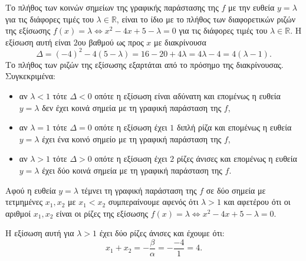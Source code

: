 \begin{alist}
\begin{rlist}
\item Το πλήθος των κοινών σημείων της γραφικής παράστασης της $f$ με την ευθεία $y = \lambda$ για τις διάφορες τιμές του $\lambda \in \mathbb{R}$, είναι το ίδιο με το πλήθος των διαφορετικών ριζών της εξίσωσης $f(x) = \lambda \Leftrightarrow x^2 - 4x + 5 - \lambda = 0$ για τις διάφορες τιμές του $\lambda \in \mathbb{R}$.
Η εξίσωση αυτή είναι $2$ου βαθμού ως προς $x$ με διακρίνουσα
\[\Delta = (-4)^2 - 4(5 - \lambda) = 16 - 20 + 4\lambda = 4\lambda - 4 = 4(\lambda - 1).\]
Το πλήθος των ριζών της εξίσωσης εξαρτάται από το πρόσημο της διακρίνουσας. Συγκεκριμένα:
\begin{itemize}
\item αν $\lambda < 1$ τότε $\Delta < 0$ οπότε η εξίσωση είναι αδύνατη και επομένως η ευθεία $y = \lambda$ δεν έχει κοινά σημεία με τη γραφική παράσταση της $f$,
\item αν $\lambda = 1$ τότε $\Delta = 0$ οπότε η εξίσωση έχει $1$ διπλή ρίζα και επομένως η ευθεία $y = \lambda$ έχει ένα κοινό σημείο με τη γραφική παράσταση της $f$,
\item αν $\lambda > 1$ τότε $\Delta > 0$ οπότε η εξίσωση έχει $2$ ρίζες άνισες και επομένως η ευθεία $y = \lambda$ έχει δύο κοινά σημεία με τη γραφική παράσταση της $f$.
\end{itemize}
\end{rlist}

\item Αφού η ευθεία $y = \lambda$ τέμνει τη γραφική παράσταση της $f$ σε δύο σημεία με τετμημένες $x_1, x_2$ με $x_1 < x_2$ συμπεραίνουμε αφενός ότι $\lambda > 1$ και αφετέρου ότι οι αριθμοί $x_1, x_2$ είναι 
οι ρίζες της εξίσωσης $f(x) = \lambda \Leftrightarrow x^2 - 4x + 5 - \lambda = 0$.

Η εξίσωση αυτή για $\lambda > 1$ έχει δύο ρίζες άνισες και έχουμε ότι:
\[x_1 + x_2 = -\dfrac{\beta}{\alpha} = -\dfrac{-4}{1} = 4.\]
\end{alist}

